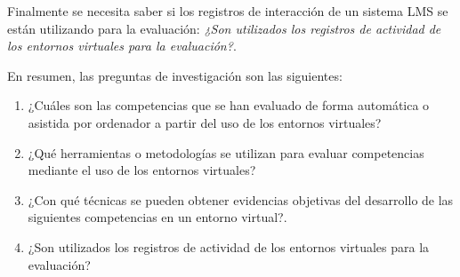 Finalmente se necesita saber si los registros de interacción de un sistema LMS se están utilizando para la evaluación: \emph{¿Son utilizados los registros de actividad de los entornos virtuales para la evaluación?}.


\bigskip
En resumen, las preguntas de investigación son las siguientes:
\begin{enumerate}
\item ¿Cuáles son las competencias que se han evaluado de forma automática o asistida por ordenador a partir del uso de los entornos virtuales?
\item ¿Qué herramientas o metodologías se utilizan para evaluar competencias mediante el uso de los entornos virtuales?
\item ¿Con qué técnicas se pueden obtener evidencias objetivas del desarrollo de las siguientes competencias en un entorno virtual?.
\item ¿Son utilizados los registros de actividad de los entornos virtuales para la evaluación?
\end{enumerate}

